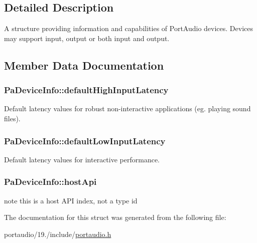 

\subsection{Detailed Description}
A structure providing information and capabilities of Port\+Audio devices. Devices may support input, output or both input and output. 

\subsection{Member Data Documentation}
\hypertarget{struct_pa_device_info_a4214826038fcaf374beb9816024e6c9f}{
\subsubsection[{default\+High\+Input\+Latency}]{ Pa\+Device\+Info\+::default\+High\+Input\+Latency}}\label{struct_pa_device_info_a4214826038fcaf374beb9816024e6c9f}
Default latency values for robust non-\/interactive applications (eg. playing sound files). \hypertarget{struct_pa_device_info_aad6629064b8c7cf043d237ea0a5cc534}{
\subsubsection[{default\+Low\+Input\+Latency}]{ Pa\+Device\+Info\+::default\+Low\+Input\+Latency}}\label{struct_pa_device_info_aad6629064b8c7cf043d237ea0a5cc534}
Default latency values for interactive performance. \hypertarget{struct_pa_device_info_afe741e4d185069577f7e74b78fdef5a4}{
\subsubsection[{host\+Api}]{ Pa\+Device\+Info\+::host\+Api}}\label{struct_pa_device_info_afe741e4d185069577f7e74b78fdef5a4}
note this is a host A\+P\+I index, not a type id 

The documentation for this struct was generated from the following file\+:\begin{DoxyCompactItemize}
\item 
portaudio/19./include/\hyperlink{portaudio_8h}{portaudio.\+h}\end{DoxyCompactItemize}
